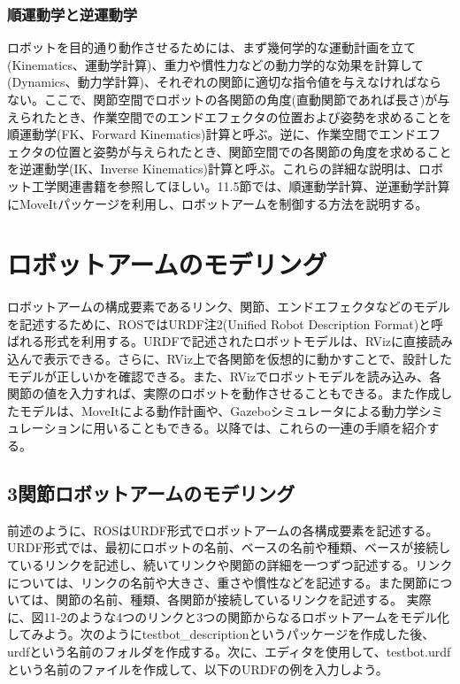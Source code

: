 \subsubsection{順運動学と逆運動学}

ロボットを目的通り動作させるためには、まず幾何学的な運動計画を立て(Kinematics、運動学計算)、重力や慣性力などの動力学的な効果を計算して(Dynamics、動力学計算)、それぞれの関節に適切な指令値を与えなければならない。ここで、関節空間でロボットの各関節の角度(直動関節であれば長さ)が与えられたとき、作業空間でのエンドエフェクタの位置および姿勢を求めることを順運動学(FK、Forward Kinematics)計算と呼ぶ。逆に、作業空間でエンドエフェクタの位置と姿勢が与えられたとき、関節空間での各関節の角度を求めることを逆運動学(IK、Inverse Kinematics)計算と呼ぶ。これらの詳細な説明は、ロボット工学関連書籍を参照してほしい。11.5節では、順運動学計算、逆運動学計算にMoveItパッケージを利用し、ロボットアームを制御する方法を説明する。

\section{ロボットアームのモデリング}

ロボットアームの構成要素であるリンク、関節、エンドエフェクタなどのモデルを記述するために、ROSではURDF注2(Unified Robot Description Format)と呼ばれる形式を利用する。URDFで記述されたロボットモデルは、RVizに直接読み込んで表示できる。さらに、RViz上で各関節を仮想的に動かすことで、設計したモデルが正しいかを確認できる。また、RVizでロボットモデルを読み込み、各関節の値を入力すれば、実際のロボットを動作させることもできる。また作成したモデルは、MoveItによる動作計画や、Gazeboシミュレータによる動力学シミュレーションに用いることもできる。以降では、これらの一連の手順を紹介する。

\subsection{3関節ロボットアームのモデリング}

前述のように、ROSはURDF形式でロボットアームの各構成要素を記述する。URDF形式では、最初にロボットの名前、ベースの名前や種類、ベースが接続しているリンクを記述し、続いてリンクや関節の詳細を一つずつ記述する。リンクについては、リンクの名前や大きさ、重さや慣性などを記述する。また関節については、関節の名前、種類、各関節が接続しているリンクを記述する。
実際に、図11-2のような4つのリンクと3つの関節からなるロボットアームをモデル化してみよう。次のようにtestbot\_descriptionというパッケージを作成した後、urdfという名前のフォルダを作成する。次に、エディタを使用して、testbot.urdfという名前のファイルを作成して、以下のURDFの例を入力しよう。

